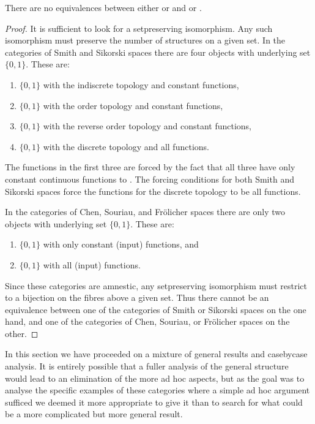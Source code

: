 \documentclass[%
12pt,%
arxiv,%
defaults
]{myclass}
\begin{document}
\begin{proposition}
There are no equivalences between either \ccat or \dcat and \kcat or \scat.
\end{proposition}



\begin{proof}
It is sufficient to look for a set\enhyp{}preserving isomorphism.
Any such isomorphism must preserve the number of structures on a given set.
In the categories of Smith and Sikorski spaces there are four objects with underlying set \(\{0,1\}\).
These are:
%
\begin{enumerate}
\item \(\{0,1\}\) with the indiscrete topology and constant functions,
\item \(\{0,1\}\) with the order topology and constant functions,
\item \(\{0,1\}\) with the reverse order topology and constant functions,
\item \(\{0,1\}\) with the discrete topology and all functions.
\end{enumerate}
%
The functions in the first three are forced by the fact that all three have only constant continuous functions to \R.
The forcing conditions for both Smith and Sikorski spaces force the functions for the discrete topology to be all functions.

In the categories of Chen, Souriau, and Fr\"olicher spaces there are only two objects with underlying set \(\{0,1\}\).
These are:
%
\begin{enumerate}
\item \(\{0,1\}\) with only constant (input) functions, and
\item \(\{0,1\}\) with all (input) functions.
\end{enumerate}

Since these categories are amnestic, any set\enhyp{}preserving isomorphism must restrict to a bijection on the fibres above a given set.
Thus there cannot be an equivalence between one of the categories of Smith or Sikorski spaces on the one hand, and one of the categories of Chen, Souriau, or Fr\"olicher spaces on the other.
\end{proof}

In this section we have proceeded on a mixture of general results and  case\enhyp{}by\enhyp{}case analysis.
It is entirely possible that a fuller analysis of the general structure would lead to an elimination of the more ad hoc aspects, but as the goal was to analyse the specific examples of these categories where a simple ad hoc argument sufficed we deemed it more appropriate to give it than to search for what could be a more complicated but more general result.
\end{document}
